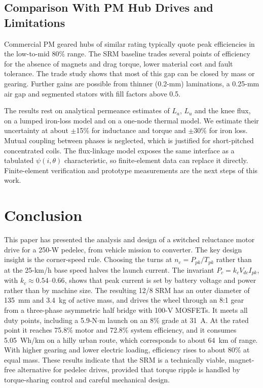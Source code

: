 \documentclass[journal]{IEEEtran}
\begin{document}
\subsection{Comparison With PM Hub Drives and Limitations}
Commercial PM geared hubs of similar rating typically quote peak efficiencies in
the low-to-mid 80\% range. The SRM baseline trades several points of efficiency
for the absence of magnets and drag torque, lower material cost and fault
tolerance. The trade study shows that most of this gap can be closed by mass
or gearing. Further gains are possible from thinner (0.2-mm) laminations, a
0.25-mm air gap and segmented stators with fill factors above 0.5.

The results rest on analytical permeance estimates of $L_a$, $L_u$ and the knee
flux, on a lumped iron-loss model and on a one-node thermal model. We
estimate their uncertainty at about $\pm$15\% for inductance and torque and
$\pm$30\% for iron loss. Mutual coupling between phases is neglected, which is
justified for short-pitched concentrated coils. The flux-linkage model exposes
the same interface as a tabulated $\psi(i,\theta)$ characteristic, so
finite-element data can replace it directly. Finite-element verification and
prototype measurements are the next steps of this work.

\section{Conclusion}
This paper has presented the analysis and design of a switched reluctance
motor drive for a 250-W pedelec, from vehicle mission to converter. The key
design insight is the corner-speed rule. Choosing the turns at
$n_c=P_{pk}/T_{pk}$ rather than at the 25-km/h base speed halves the launch
current. The invariant $P_c=k_cV_{dc}I_{pk}$, with $k_c\approx0.54$--$0.66$, shows that
peak current is set by battery voltage and power rather than by machine size.
The resulting 12/8 SRM has an outer diameter of 135~mm and 3.4~kg of active
mass, and drives the wheel through an 8:1 gear from a three-phase asymmetric
half bridge with 100-V MOSFETs. It meets all duty points, including a
5.9-N$\cdot$m launch on an 8\% grade at 31~A. At the rated point it reaches 75.8\%
motor and 72.8\% system efficiency, and it consumes 5.05~Wh/km on a hilly urban
route, which corresponds to about 64~km of range. With higher gearing and lower electric
loading, efficiency rises to about 80\% at equal mass. These results indicate
that the SRM is a technically viable, magnet-free alternative for pedelec
drives, provided that torque ripple is handled by torque-sharing control and
careful mechanical design.



\end{document}
